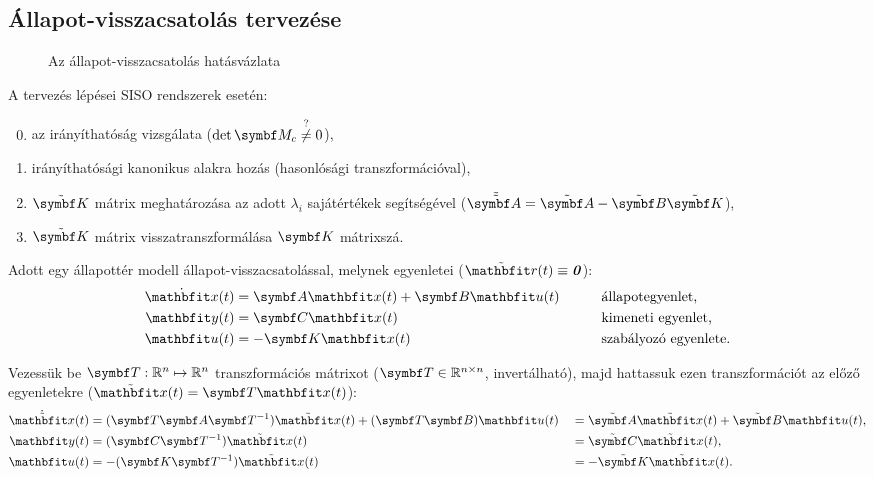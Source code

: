 \subsection{Állapot-visszacsatolás tervezése}

\begin{figure}[htb]
  \centering
  
  \caption{Az állapot-visszacsatolás hatásvázlata}
  \label{fig:state-feedback}
\end{figure}

A tervezés lépései SISO rendszerek esetén:
\begin{enumerate}[label={\color{darkRed}\theenumi})]
  \setcounter{enumi}{-1}
  \item az irányíthatóság vizsgálata ($\det \rmat M_c \overset{?}{\neq} 0$),
  \item irányíthatósági kanonikus alakra hozás (hasonlósági transzformációval),
  \item $\tilde{\rmat K}$ mátrix meghatározása az adott $\lambda_i$ sajátértékek
        segítségével ($\tilde{\tmat A} = \tmat A - \tmat B \tmat K$),
  \item $\tilde{\rmat K}$ mátrix visszatranszformálása $\rmat K$ mátrixszá.
\end{enumerate}

Adott egy állapottér modell állapot-visszacsatolással, melynek egyenletei
($\tvec r(t) \equiv \nvec$):
\begin{alignat}{9}
  \dot{\rvec x}(t) & = \rmat A \rvec x(t) + \rmat B \rvec u(t) \quad \quad
                   &
                   & \text{állapotegyenlet,}
  \\
  \rvec y(t)       & = \rmat C \rvec x(t)
                   &
                   & \text{kimeneti egyenlet,}
  \\
  \rvec u(t)       & = - \rmat K \rvec x(t)
                   &
                   & \text{szabályozó egyenlete.}
\end{alignat}

Vezessük be $\rmat T: \mathbb R^n \mapsto \mathbb R^n$ transzformációs mátrixot
($\rmat T \in \mathbb R^{n \times n}$, invertálható), majd hattassuk ezen
transzformációt az előző egyenletekre ($\tvec x(t) = \rmat T \rvec x(t)$):
\begin{alignat}{9}
  \dot{\tvec x}(t) & = (\rmat T \rmat A \rmat T^{-1}) \tvec x(t) + (\rmat T \rmat B) \rvec u(t)
                   &
                   & = \tmat A \tvec x(t) + \tmat B \rvec u(t),
  \\
  \rvec y(t)       & = (\rmat C \rmat T^{-1}) \tvec x(t)
                   &
                   & = \tmat C \tvec x(t),
  \\
  \rvec u(t)       & = - (\rmat K \rmat T^{-1}) \tvec x(t)
                   &
                   & = - \tmat K \tvec x(t).
\end{alignat}

